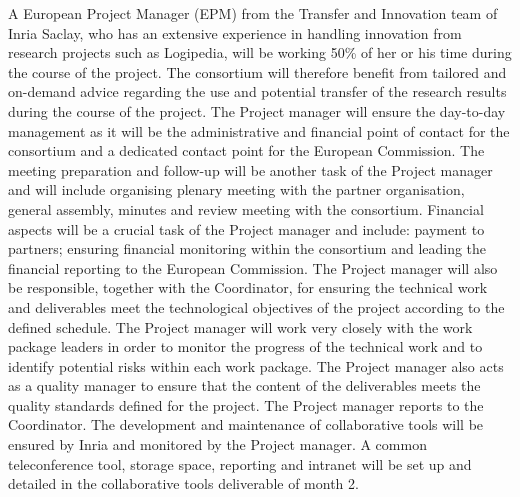 \begin{workpackage}[id=management,type=MGT,wphases=1-48,
  short=Management,
  title=Management,
  lead=Inr,InrRM=34,InnRM=2,SacRM=2,TumRM=2,LieRM=2,BelRM=2,DelRM=2,FauRM=2]
\begin{tasklist}
\begin{task}[id=admin,title=Administrative and Financial Management,shorttitle=Adm.\&Fin.,lead=Inr,InrRM=10,wphases=1-48]
    A European Project Manager (EPM) from the Transfer and Innovation
    team of Inria Saclay, who has an extensive experience in handling
    innovation from research projects such as Logipedia, will be working
    50\% of her or his time during the course of the project.
     The
    consortium will therefore benefit from tailored and on-demand
    advice regarding the use and potential transfer of the research
    results during the course of the project.  The Project manager will ensure
    the
    day-to-day management as it will be the administrative and
    financial point of contact for the consortium and a dedicated
    contact point for the European Commission. The meeting preparation
    and follow-up will be another task of the Project manager and will include
    organising plenary meeting with the partner organisation, general
    assembly, minutes and review meeting with the consortium. Financial
    aspects will be a crucial task of the Project manager and include:
    payment to
    partners; ensuring financial monitoring within the consortium and
    leading the financial reporting to the European Commission.  The
    Project manager will also be responsible, together with the 
    Coordinator, for ensuring the technical work and deliverables meet
    the technological objectives of the project according to the
    defined schedule. The Project manager will work very closely with the work
    package leaders in order to monitor the progress of the technical
    work and to identify potential risks within each work package.
    The Project manager also
    acts as a quality manager to ensure that the content of the
    deliverables meets the quality standards defined for the
    project. The Project manager reports to the Coordinator.  The
    development and maintenance of collaborative tools will be ensured
    by Inria and monitored by the Project manager. A common teleconference tool,
    storage space, reporting and intranet will be set up and detailed
    in the collaborative tools deliverable of month 2.
  \end{task}


\end{tasklist}
\end{workpackage}
